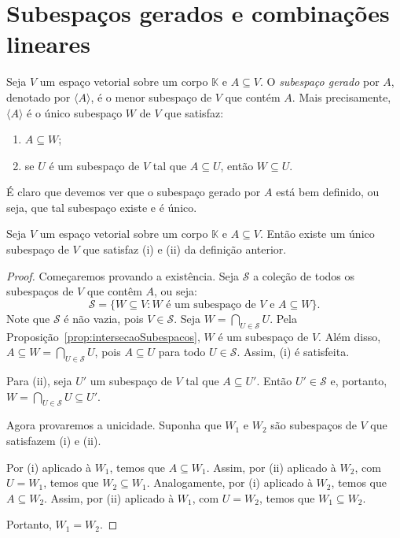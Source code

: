 \section{Subespaços gerados e combinações lineares}

\begin{definition}
    Seja $V$ um espaço vetorial sobre um corpo $\mathbb K$ e $A \subseteq V$.
    O \emph{subespaço gerado} por $A$, denotado por $\langle A \rangle$, é o menor subespaço de $V$ que contém $A$.
    Mais precisamente, $\langle A\rangle$ é o único subespaço $W$ de $V$ que satisfaz:
    \begin{enumerate}[label=(\roman*)]
        \item $A \subseteq W$;
        \item se $U$ é um subespaço de $V$ tal que $A \subseteq U$, então $W \subseteq U$.
    \end{enumerate}
\end{definition}
É claro que devemos ver que o subespaço gerado por $A$ está bem definido, ou seja, que tal subespaço existe e é único.
\begin{lemma}
    Seja $V$ um espaço vetorial sobre um corpo $\mathbb K$ e $A \subseteq V$.
    Então existe um único subespaço de $V$ que satisfaz (i) e (ii) da definição anterior.
\end{lemma}
\begin{proof}
    Começaremos provando a existência.
    Seja $\mathcal S$ a coleção de todos os subespaços de $V$ que contêm $A$, ou seja:
    \begin{equation*}
        \mathcal S = \{W \subseteq V : W \text{ é um subespaço de } V \text{ e } A \subseteq W\}.
    \end{equation*}
    Note que $\mathcal S$ é não vazia, pois $V \in \mathcal S$.
    Seja $W = \bigcap_{U \in \mathcal S} U$.
    Pela Proposição~\ref{prop:intersecaoSubespacos}, $W$ é um subespaço de $V$.
    Além disso, $A \subseteq W=\bigcap_{U \in \mathcal S} U$, pois $A \subseteq U$ para todo $U \in \mathcal S$.
    Assim, (i) é satisfeita.

    Para (ii), seja $U'$ um subespaço de $V$ tal que $A \subseteq U'$.
    Então $U' \in \mathcal S$ e, portanto, $W = \bigcap_{U \in \mathcal S} U \subseteq U'$.

    Agora provaremos a unicidade.
    Suponha que $W_1$ e $W_2$ são subespaços de $V$ que satisfazem (i) e (ii).

    Por (i) aplicado à $W_1$, temos que $A \subseteq W_1$.
    Assim, por (ii) aplicado à $W_2$, com $U=W_1$, temos que $W_2 \subseteq W_1$.
    Analogamente, por (i) aplicado à $W_2$, temos que $A \subseteq W_2$.
    Assim, por (ii) aplicado à $W_1$, com $U=W_2$, temos que $W_1 \subseteq W_2$.

    Portanto, $W_1 = W_2$.
\end{proof}

